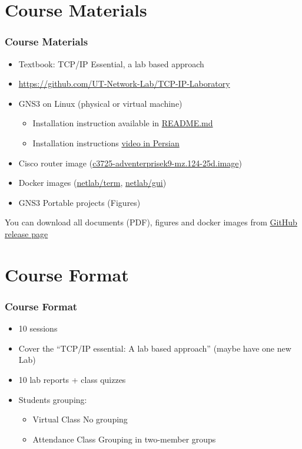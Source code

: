 \documentclass[aspectratio=169,15pt]{beamer}
\begin{document}
\section{Course Materials}
\begin{frame}
    \frametitle{Course Materials}

    \begin{itemize}
        \item Textbook: TCP/IP Essential, a lab based approach
        \item \url{https://github.com/UT-Network-Lab/TCP-IP-Laboratory}
        \item GNS3 on Linux (physical or virtual machine)
        \begin{itemize}
            \item Installation instruction available in \href{https://github.com/UT-Network-Lab/TCP-IP-Laboratory/blob/master/README.md}{README.md}
            \item Installation instructions \href{https://www.dropbox.com/s/bad8eongryfnylr/GNS3\%20Installation\%20Tutorial.mp4?dl=0}{video in Persian}
        \end{itemize}
        \item Cisco router image (\href{https://www.dropbox.com/s/8scxq3o8yvb8njw/c3725-adventerprisek9-mz.124-25d.image?dl=0}{c3725-adventerprisek9-mz.124-25d.image})
        \item Docker images (\href{https://hub.docker.com/r/utnetlab/term}{netlab/term}, \href{https://hub.docker.com/r/utnetlab/gui}{netlab/gui})
        \item GNS3 Portable projects (Figures)
    \end{itemize}
    You can download all documents (PDF), figures and docker images from \href{https://github.com/UT-Network-Lab/TCP-IP-Laboratory/releases/latest}{GitHub release page}

\end{frame}

\section{Course Format}
\begin{frame}
    \frametitle{Course Format}

    \begin{itemize}
        \item 10 sessions
        \item Cover the “TCP/IP essential: A lab based approach” (maybe have one new Lab)
        \item 10 lab reports + class quizzes
        \item Students grouping:
        \begin{itemize}
            \item \alert{Virtual Class} No grouping
            \item \alert{Attendance Class} Grouping in two-member groups
        \end{itemize}
    \end{itemize}
    
\end{frame}
\end{document}
